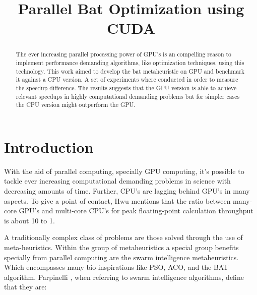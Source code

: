\documentclass[conference]{IEEEtran}
\begin{document}
\title{Parallel Bat Optimization using CUDA}

\author{
\and
{}
}

\maketitle

\begin{abstract}
The ever increasing parallel processing power of GPU's is an compelling
reason to implement performance demanding algorithms, like optimization
techniques, using this technology. This work aimed to develop the bat
metaheuristic on GPU and benchmark it against a CPU version. A set of
experiments where conducted in order to measure the speedup difference.
The results suggests that the GPU version is able to achieve relevant
speedups in highly computational demanding problems but for simpler
cases the CPU version might outperform the GPU.
\end{abstract}

\IEEEpeerreviewmaketitle

\section{Introduction} %

With the aid of parallel computing, specially GPU computing, it's
possible to tackle ever increasing computational demanding problems in science
with decreasing amounts of time. Further, CPU's are lagging behind GPU's in
many aspects. To give a point of contact, Hwu \cite{programmingProcessors}
mentions that the ratio between many-core GPU's and multi-core CPU's for
peak floating-point calculation throughput is about 10 to 1.

A traditionally complex class of problems are those solved through
the use of meta-heuristics. Within the group of metaheuristics a
special group benefits specially from parallel computing are the swarm
intelligence metaheuristics. Which encompasses many bio-inspirations
like PSO, ACO, and the BAT algorithm. Parpinelli
\cite{newInspirations}, when referring to swarm intelligence algorithms,
define that they are:
\end{document}
